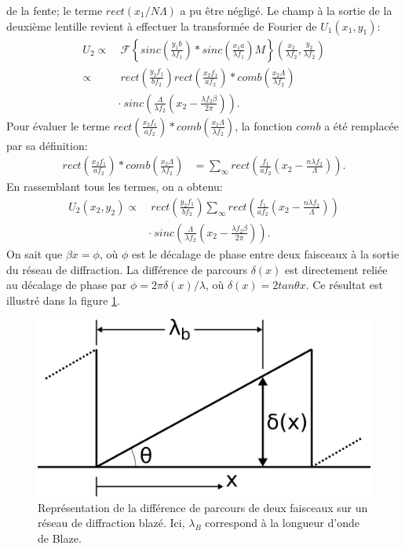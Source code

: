 \documentclass[conference]{IEEEtran}
\begin{document}
de la fente; le terme $rect(x_1/N\Lambda)$ a pu être négligé. Le champ à la sortie de la deuxième lentille revient à effectuer la transformée de Fourier
de $U_1(x_1,y_1)$:
\begin{align*}
    U_2\propto&\ \mathscr{F}\left\{sinc(\frac{y_1b}{\lambda f_1})\ast sinc(\frac{x_1a}{\lambda f_1})M\right\}(\frac{x_2}{\lambda f_2},\frac{y_2}{\lambda f_2})\\
    \propto&\ rect(\frac{y_2 f_1}{b f_2})rect(\frac{x_2 f_1}{a f_2})\ast comb(\frac{x_2 \Lambda}{\lambda f_2})\\
    &\cdot\ sinc(\frac{\Lambda}{\lambda f_2}(x_2-\frac{\lambda f_2 \beta}{2\pi})).
\end{align*}
Pour évaluer le terme $rect(\frac{x_2 f_1}{a f_2})\ast comb(\frac{x_2 \Lambda}{\lambda f_2})$, la fonction $comb$ a été remplacée par sa définition:
\begin{align*}
    rect(\frac{x_2 f_1}{a f_2})\ast comb(\frac{x_2 \Lambda}{\lambda f_2})&=\sum_{\infty}rect(\frac{f_1}{a f_2}(x_2-\frac{n\lambda f_2}{\Lambda})).
\end{align*}
En rassemblant tous les termes, on a obtenu:
\begin{align*}
    U_2(x_2,y_2)\propto&\ rect(\frac{y_2 f_1}{b f_2})\sum_{\infty}rect(\frac{f_1}{a f_2}(x_2-\frac{n\lambda f_2}{\Lambda}))\\
    &\cdot \ sinc(\frac{\Lambda}{\lambda f_2}(x_2-\frac{\lambda f_2 \beta}{2\pi})).
\end{align*}
On sait que $\beta x = \phi$, où $\phi$ est le décalage de phase entre deux faisceaux à la sortie du réseau de diffraction.
La différence de parcours $\delta(x)$ est directement reliée au décalage de phase par $\phi=2\pi\delta(x)/\lambda$, où $\delta(x)=2tan\theta x$.
Ce résultat est illustré dans la figure \ref{beta}. 
\begin{figure}[H]
    \centering
    \includegraphics[scale=0.2]{beta.png}
    \caption{Représentation de la différence de parcours de deux faisceaux sur un réseau de diffraction
    blazé. Ici, $\lambda_B$ correspond à la longueur d'onde de Blaze. \label{beta}}
\end{figure}
\end{document}
